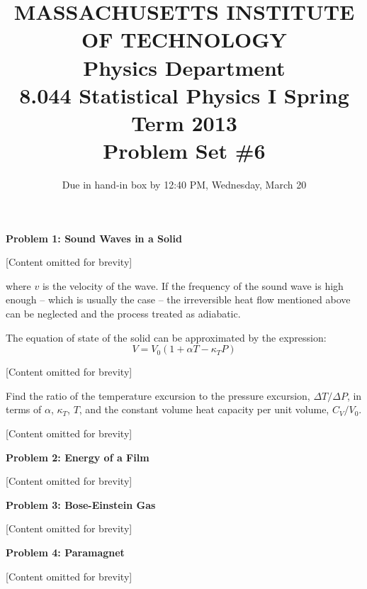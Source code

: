 \documentclass{article}
\begin{document}
\title{MASSACHUSETTS INSTITUTE OF TECHNOLOGY\\
Physics Department\\
8.044 Statistical Physics I Spring Term 2013\\
Problem Set \#6}
\date{Due in hand-in box by 12:40 PM, Wednesday, March 20}

\maketitle

\noindent\textbf{Problem 1: Sound Waves in a Solid}

[Content omitted for brevity]

where $v$ is the velocity of the wave. If the frequency of the sound wave is high enough -- which is usually the case -- the irreversible heat flow mentioned above can be neglected and the process treated as adiabatic.

The equation of state of the solid can be approximated by the expression:
\begin{equation*}
V = V_0 (1 + \alpha T - \kappa_T P)
\end{equation*}

[Content omitted for brevity]

Find the ratio of the temperature excursion to the pressure excursion, $\Delta T / \Delta P$, in terms of $\alpha$, $\kappa_T$, $T$, and the constant volume heat capacity per unit volume, $C_V / V_0$.

[Content omitted for brevity]

\noindent\textbf{Problem 2: Energy of a Film}

[Content omitted for brevity]

\noindent\textbf{Problem 3: Bose-Einstein Gas}

[Content omitted for brevity]

\noindent\textbf{Problem 4: Paramagnet}

[Content omitted for brevity]
\end{document}
